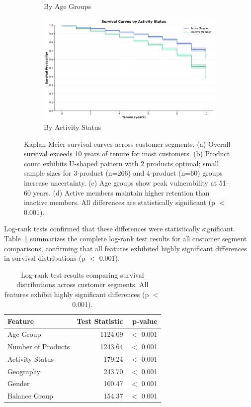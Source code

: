 \documentclass[12pt]{article}
\begin{document}
\begin{figure}[H]
\begin{subfigure}[b]{0.48\textwidth}
\caption{By Age Groups}
\label{fig:survival_age}
\end{subfigure}
\hfill
\begin{subfigure}[b]{0.48\textwidth}
\centering
\includegraphics[width=\textwidth]{img/12_survival_active_status_plot.png}
\caption{By Activity Status}
\label{fig:survival_active}
\end{subfigure}
\caption{Kaplan-Meier survival curves across customer segments. (a) Overall survival exceeds 10 years of tenure for most customers. (b) Product count exhibits U-shaped pattern with 2 products optimal; small sample sizes for 3‑product (n=266) and 4‑product (n=60) groups increase uncertainty. (c) Age groups show peak vulnerability at 51–60 years. (d) Active members maintain higher retention than inactive members. All differences are statistically significant (p $<$ 0.001).}
\label{fig:survival_all}
\end{figure}

Log‑rank tests confirmed that these differences were statistically significant. Table~\ref{tab:logrank_results} summarizes the complete log‑rank test results for all customer segment comparisons, confirming that all features exhibited highly significant differences in survival distributions (p $<$ 0.001).

\begin{table}[H]
\centering
\small
\caption{Log-rank test results comparing survival distributions across customer segments. All features exhibit highly significant differences (p $<$ 0.001).}
\label{tab:logrank_results}
\begin{tabular}{lrr}
\toprule
\textbf{Feature} & \textbf{Test Statistic} & \textbf{p-value} \\
\midrule
Age Group & 1124.09 & $<$ 0.001 \\
Number of Products & 1243.64 & $<$ 0.001 \\
Activity Status & 179.24 & $<$ 0.001 \\
Geography & 243.70 & $<$ 0.001 \\
Gender & 100.47 & $<$ 0.001 \\
Balance Group & 154.37 & $<$ 0.001 \\
\bottomrule
\end{tabular}
\end{table}
\end{document}

